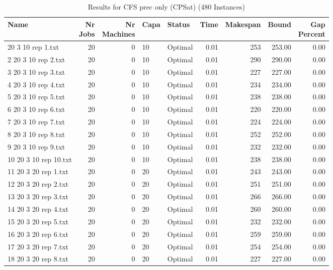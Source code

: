 \begin{longtable}{lrrllrrrr}
\caption{Results for CFS prec only (CPSat) (480 Instances)}\\\toprule
Name & \shortstack{Nr\\Jobs} & \shortstack{Nr\\Machines} & Capa & Status  & Time & Makespan & Bound & \shortstack{Gap\\Percent}\\ \midrule
\endhead
\bottomrule
\endfoot
1 20 3 10 rep 1.txt & 20 & 0 & 10 & Optimal &  0.01 & 253 & 253.00 &  0.00\\
2 20 3 10 rep 2.txt & 20 & 0 & 10 & Optimal &  0.01 & 290 & 290.00 &  0.00\\
3 20 3 10 rep 3.txt & 20 & 0 & 10 & Optimal &  0.01 & 227 & 227.00 &  0.00\\
4 20 3 10 rep 4.txt & 20 & 0 & 10 & Optimal &  0.01 & 234 & 234.00 &  0.00\\
5 20 3 10 rep 5.txt & 20 & 0 & 10 & Optimal &  0.01 & 238 & 238.00 &  0.00\\
6 20 3 10 rep 6.txt & 20 & 0 & 10 & Optimal &  0.01 & 220 & 220.00 &  0.00\\
7 20 3 10 rep 7.txt & 20 & 0 & 10 & Optimal &  0.01 & 224 & 224.00 &  0.00\\
8 20 3 10 rep 8.txt & 20 & 0 & 10 & Optimal &  0.01 & 252 & 252.00 &  0.00\\
9 20 3 10 rep 9.txt & 20 & 0 & 10 & Optimal &  0.01 & 232 & 232.00 &  0.00\\
10 20 3 10 rep 10.txt & 20 & 0 & 10 & Optimal &  0.01 & 238 & 238.00 &  0.00\\
11 20 3 20 rep 1.txt & 20 & 0 & 20 & Optimal &  0.01 & 243 & 243.00 &  0.00\\
12 20 3 20 rep 2.txt & 20 & 0 & 20 & Optimal &  0.01 & 251 & 251.00 &  0.00\\
13 20 3 20 rep 3.txt & 20 & 0 & 20 & Optimal &  0.01 & 266 & 266.00 &  0.00\\
14 20 3 20 rep 4.txt & 20 & 0 & 20 & Optimal &  0.01 & 260 & 260.00 &  0.00\\
15 20 3 20 rep 5.txt & 20 & 0 & 20 & Optimal &  0.01 & 232 & 232.00 &  0.00\\
16 20 3 20 rep 6.txt & 20 & 0 & 20 & Optimal &  0.01 & 259 & 259.00 &  0.00\\
17 20 3 20 rep 7.txt & 20 & 0 & 20 & Optimal &  0.01 & 254 & 254.00 &  0.00\\
18 20 3 20 rep 8.txt & 20 & 0 & 20 & Optimal &  0.01 & 227 & 227.00 &  0.00\\

\end{longtable}
